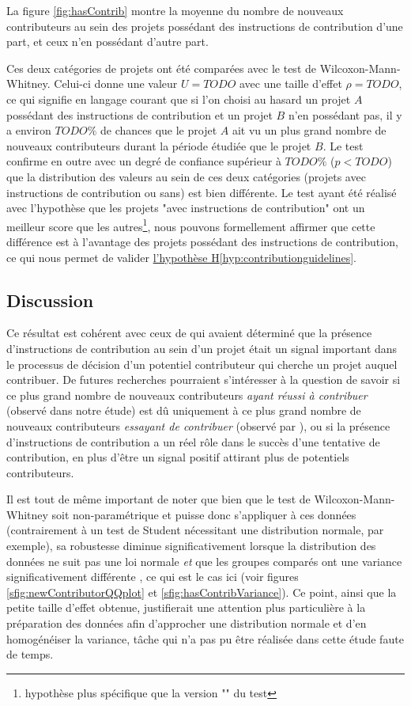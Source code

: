 La figure \ref{fig:hasContrib} montre la moyenne du nombre de nouveaux contributeurs au sein des projets
possédant des instructions de contribution d'une part, et ceux n'en possédant d'autre part.

Ces deux catégories de projets ont été comparées avec le test de Wilcoxon-Mann-Whitney. Celui-ci donne une
valeur $U = TODO$ avec une taille d'effet $ρ = TODO$, ce qui signifie en langage courant que si l'on choisi au
hasard un projet $A$ possédant des instructions de contribution et un projet $B$ n'en possédant pas, il y a
environ $TODO\%$ de chances que le projet $A$ ait vu un plus grand nombre de nouveaux contributeurs durant la
période étudiée que le projet $B$. Le test confirme en outre avec un degré de confiance supérieur à $TODO\%$
($p < TODO$) que la distribution des valeurs au sein de ces deux catégories (projets avec instructions de
contribution ou sans) est bien différente. Le test ayant été réalisé avec l'hypothèse que les projets "avec
instructions de contribution" ont un meilleur score que les autres\footnote{hypothèse plus spécifique que la
version "" du test}, nous pouvons formellement affirmer que cette différence est à l'avantage
des projets possédant des instructions de contribution, ce qui nous permet de valider
\hyperref[hyp:contributionguidelines]{l'hypothèse H\ref*{hyp:contributionguidelines}}.

\subsection{Discussion}

Ce résultat est cohérent avec ceux de \textcite[p.~11]{signals-2019} qui avaient déterminé que la présence
d'instructions de contribution au sein d'un projet était un signal important dans le processus de décision
d'un potentiel contributeur qui cherche un projet auquel contribuer. De futures recherches pourraient
s'intéresser à la question de savoir si ce plus grand nombre de nouveaux contributeurs \emph{ayant réussi à
contribuer} (observé dans notre étude) est dû uniquement à ce plus grand nombre de nouveaux contributeurs
\emph{essayant de contribuer} (observé par \textcite{signals-2019}), ou si la présence d'instructions de
contribution a un réel rôle dans le succès d'une tentative de contribution, en plus d'être un signal positif
attirant plus de potentiels contributeurs.

Il est tout de même important de noter que bien que le test de Wilcoxon-Mann-Whitney soit non-paramétrique et
puisse donc s'appliquer à ces données (contrairement à un test de Student nécessitant une distribution
normale, par exemple), sa robustesse diminue significativement lorsque la distribution des données ne suit pas
une loi normale \emph{et} que les groupes comparés ont une variance significativement différente
\parencite{WMW-robustness-1998}, ce qui est le cas ici (voir figures \ref{sfig:newContributorQQplot} et
\ref{sfig:hasContribVariance}). Ce point, ainsi que la petite taille d'effet obtenue, justifierait une
attention plus particulière à la préparation des données afin d'approcher une distribution normale et d'en
homogénéiser la variance, tâche qui n'a pas pu être réalisée dans cette étude faute de temps.

